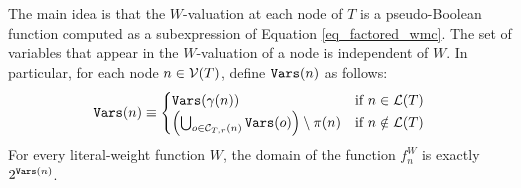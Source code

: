 The main idea is that the $W$-valuation at each node of $T$ is a pseudo-Boolean function computed as a subexpression of Equation \eqref{eq_factored_wmc}. The set of variables that appear in the $W$-valuation of a node is independent of $W$.
In particular, for each node $n \in \mathcal{V}(T)$, define $\texttt{\upshape Vars}(n)$ as follows:
\begin{equation}
    \texttt{\upshape Vars}(n) \equiv
    \begin{cases}
        \texttt{\upshape Vars}(\gamma(n)) & \text{if}~n \in \mathcal{L}(T) \\
        \left( \bigcup_{o \in \mathcal{C}_{T,r}(n)} \texttt{\upshape Vars}(o) \right) \setminus \pi(n) & \text{if}~n \notin \mathcal{L}(T)
    \end{cases}
\end{equation}
For every literal-weight function $W$, the domain of the function $f^W_n$ is exactly $2^{\texttt{\upshape Vars}(n)}$.

